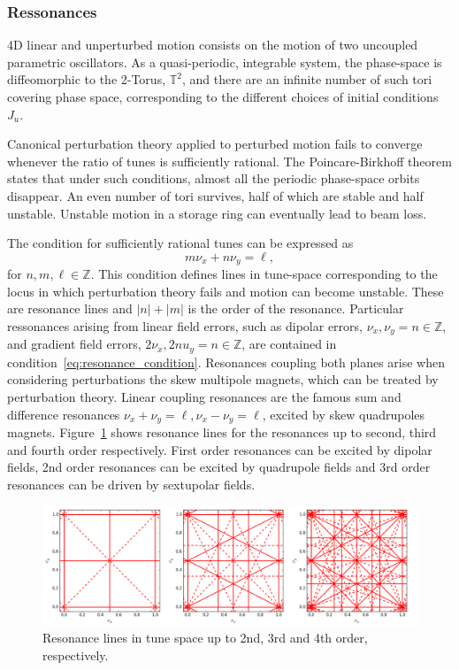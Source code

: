 \subsubsection{Ressonances}
4D linear and unperturbed motion consists on the motion of two uncoupled parametric oscillators. As a quasi-periodic, integrable system, the phase-space is diffeomorphic to the 2-Torus, $\mathbb{T}^2$, and there are an infinite number of such tori covering phase space, corresponding to the different choices of initial conditions $J_u$.

Canonical perturbation theory applied to perturbed motion fails to converge whenever the ratio of tunes is sufficiently rational. The Poincare-Birkhoff theorem states that under such conditions, almost all the periodic phase-space orbits disappear. An even number of tori survives, half of which are stable and half unstable. Unstable motion in a storage ring can eventually lead to beam loss.

The condition for sufficiently rational tunes can be expressed as
\begin{equation}
        m\nu_x + n\nu_y = \ell,
        \label{eq:resonance_condition}
\end{equation}
    for $n, m, \ell\in\mathbb{Z}$. This condition defines lines in tune-space corresponding to the locus in which perturbation theory fails and motion can become unstable. These are resonance lines and $|n|+|m|$ is the order of the resonance. Particular ressonances arising from linear field errors, such as dipolar errors, $\nu_x, \nu_y = n\in\mathbb{Z}$, and gradient field errors, $2\nu_x, 2nu_y = n\in\mathbb{Z}$, are contained in condition~\eqref{eq:resonance_condition}. Resonances coupling both planes arise when considering perturbations the skew multipole magnets, which can be treated by perturbation theory. Linear coupling resonances are the famous sum and difference resonances $\nu_x + \nu_y = \ell, \nu_x - \nu_y = \ell$, excited by skew quadrupoles magnets.
    Figure~\ref{resons} shows resonance lines for the resonances up to second, third and fourth order respectively. First order resonances can be excited by dipolar fields, 2nd order resonances can be excited by quadrupole fields and 3rd order resonances can be driven by sextupolar fields.
\begin{figure}[thb]
    \centering
    \includegraphics[width=\textwidth]{Images/tunes.png}
    \caption{Resonance lines in tune space up to 2nd, 3rd and 4th order, respectively.}
    \label{resons}
\end{figure}
